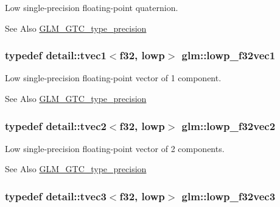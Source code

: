 Low single-\/precision floating-\/point quaternion. \begin{DoxySeeAlso}{See Also}
\hyperlink{group__gtc__type__precision}{G\-L\-M\-\_\-\-G\-T\-C\-\_\-type\-\_\-precision} 
\end{DoxySeeAlso}
\hypertarget{group__gtc__type__precision_gae802918ade0497b72c606430830f5ebb}{
\subsubsection[{lowp\-\_\-f32vec1}]{\setlength{\rightskip}{0pt plus 5cm}typedef detail\-::tvec1$<$f32, lowp$>$ {\bf glm\-::lowp\-\_\-f32vec1}}}\label{group__gtc__type__precision_gae802918ade0497b72c606430830f5ebb}
Low single-\/precision floating-\/point vector of 1 component. \begin{DoxySeeAlso}{See Also}
\hyperlink{group__gtc__type__precision}{G\-L\-M\-\_\-\-G\-T\-C\-\_\-type\-\_\-precision} 
\end{DoxySeeAlso}
\hypertarget{group__gtc__type__precision_ga7faa2c9884c87b1e6512a966adad69e4}{
\subsubsection[{lowp\-\_\-f32vec2}]{\setlength{\rightskip}{0pt plus 5cm}typedef detail\-::tvec2$<$f32, lowp$>$ {\bf glm\-::lowp\-\_\-f32vec2}}}\label{group__gtc__type__precision_ga7faa2c9884c87b1e6512a966adad69e4}
Low single-\/precision floating-\/point vector of 2 components. \begin{DoxySeeAlso}{See Also}
\hyperlink{group__gtc__type__precision}{G\-L\-M\-\_\-\-G\-T\-C\-\_\-type\-\_\-precision} 
\end{DoxySeeAlso}
\hypertarget{group__gtc__type__precision_ga1f878d91a5f5ab92c756244b62af7248}{
\subsubsection[{lowp\-\_\-f32vec3}]{\setlength{\rightskip}{0pt plus 5cm}typedef detail\-::tvec3$<$f32, lowp$>$ {\bf glm\-::lowp\-\_\-f32vec3}}}\label{group__gtc__type__precision_ga1f878d91a5f5ab92c756244b62af7248}
